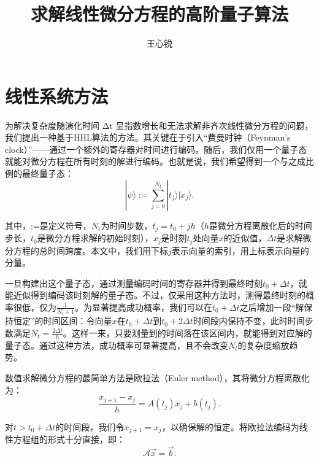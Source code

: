 \documentclass{article}
\title{求解线性微分方程的高阶量子算法}
\author{王心锐}
\theoremstyle{definition}
\begin{document}
\maketitle

\section{线性系统方法}

为解决复杂度随演化时间 Δt 呈指数增长和无法求解非齐次线性微分方程的问题，我们提出一种基于HHL算法的方法。其关键在于引入“费曼时钟（Feynman's clock）”——通过一个额外的寄存器对时间进行编码。随后，我们仅用一个量子态就能对微分方程在所有时刻的解进行编码。也就是说，我们希望得到一个与之成比例的最终量子态：
\[
|\psi\rangle := \sum_{j=0}^{N_{t}} |t_{j}\rangle |x_{j}\rangle.
\]

其中，:=是定义符号，\(N_t\)为时间步数，\(t_j = t_0 + jh\)（\(h\)是微分方程离散化后的时间步长，\(t_0\)是微分方程求解的初始时刻），\(x_j\)是时刻\(t_j\)处向量\(x\)的近似值，\(\Delta t\)是求解微分方程的总时间跨度。本文中，我们用下标\(j\)表示向量的索引，用上标表示向量的分量。

一旦构建出这个量子态，通过测量编码时间的寄存器并得到最终时刻\(t_0+\Delta t\)，就能近似得到编码该时刻解的量子态。不过，仅采用这种方法时，测得最终时刻的概率很低，仅为\(\frac{1}{N_t + 1}\)。为显著提高成功概率，我们可以在\(t_0+\Delta t\)之后增加一段“解保持恒定”的时间区间：令向量\(x\)在\(t_0+\Delta t\)到\(t_0 + 2\Delta t\)时间段内保持不变，此时时间步数满足\(N_t = \frac{2\Delta t}{h}\)。这样一来，只要测量到的时间落在该区间内，就能得到对应解的量子态。通过这种方法，成功概率可显著提高，且不会改变\(N_t\)的复杂度缩放趋势。

数值求解微分方程的最简单方法是欧拉法（Euler method），其将微分方程离散化为：
\[
\frac{x_{j+1}-x_{j}}{h} = A(t_{j}) x_{j} + b(t_{j}). 
\]

对\(t > t_0+\Delta t\)的时间段，我们令\(x_{j+1}=x_j\)，以确保解的恒定。将欧拉法编码为线性方程组的形式十分直接，即：
\[
\mathcal{A} \vec{x} = \vec{b}. 
\]
\end{document}
